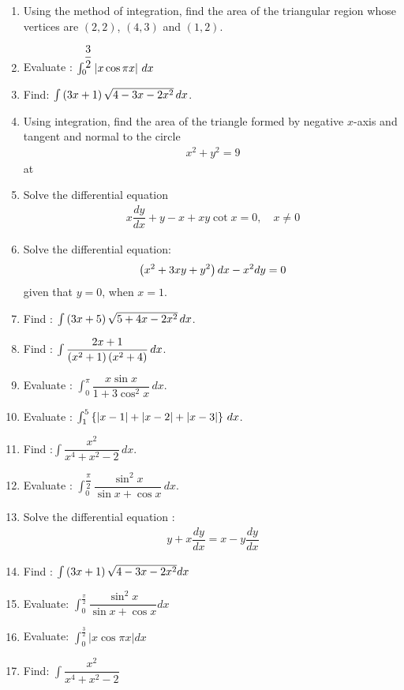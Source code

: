 \begin{enumerate}
	\item Using the method of integration, find the area of the triangular region whose vertices are $(2, 2)$, $(4, 3)$ and $(1, 2)$.
\item Evaluate : $\int_{0}^{\dfrac{3}{2}} \left\vert x \cos \pi x\right\vert\,dx$
    \item Find: $\int \left(3x +1\right)\sqrt{4-3x-2x^2} \,dx$.
    \item Using integration, find the area of the triangle formed by negative $x$-axis and tangent and normal to the circle
          \begin{align*}
              x^2 + y^2 =9
          \end{align*}
          at 
    \item Solve the differential equation
          \begin{align*}
              x\dfrac{dy}{dx} +y -x +xy \cot x= 0, \quad x\neq 0
          \end{align*}
    \item Solve the differential equation:
          \begin{align*}
              \left(x^2+3xy+y^2\right)dx -x^2dy = 0
          \end{align*}
          given that $y=0$, when $x=1$.
    \item Find : $\int \left(3x+5\right)\sqrt{5+4x-2x^2}\,dx$.
    \item Find : $\int \dfrac{2x+1}{\left(x^2+1\right)\left(x^2+4\right)}\,dx$.
    \item Evaluate : $\int_{0}^{\pi}\dfrac{x\sin x}{1+3\cos^2 x}\,dx$.
    \item Evaluate : $\int_{1}^{5}\left\{\left\vert x-1\right\vert+\left\vert x-2\right\vert+\left\vert x-3\right\vert\right\}\,dx$.
    \item Find :$\int \dfrac{x^2}{x^4 + x^2 -2}\,dx$.
    \item Evaluate : $\int_{0}^{\dfrac{\pi}{2}} \dfrac{\sin^2 x}{\sin x + \cos x} \,dx$.
    \item Solve the differential equation :
          \begin{align*}
              y+ x\dfrac{dy}{dx} = x-y\dfrac{dy}{dx}
          \end{align*}

\item Find : $\int{\ensuremath{\left(3x+1\right)}\sqrt{4 - 3x - 2x^2}dx}$
\item Evaluate: $ \int^{\frac{\pi}{2}}_0{\dfrac{\sin^2{x}}{\sin{x} + \cos{x}}dx}$
\item Evaluate: $\int^{\frac{3}{2}}_0{|x\cos{\pi x}|dx}$
\item Find: $\int{\dfrac{x^2}{x^4 + x^2 -2}}$
\end{enumerate}
